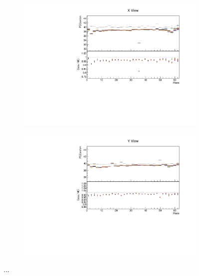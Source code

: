 \documentclass[12pt,a4paper]{article}
\begin{document}
\begin{figure}[h!]
\begin{subfigure}{0.5\textwidth}
  \end{subfigure}
  \begin{subfigure}{0.5\textwidth}
    \includegraphics[width=\linewidth]{essentialsec_tb/pecorrcm_plane_x.pdf}
  \end{subfigure}
  \begin{subfigure}{0.5\textwidth}
    \includegraphics[width=\linewidth]{essentialsec_tb/pecorrcm_plane_y.pdf}
  \end{subfigure}
  \caption{...}
  \label{figAbsCalibPlane1}
\end{figure}
\end{document}
